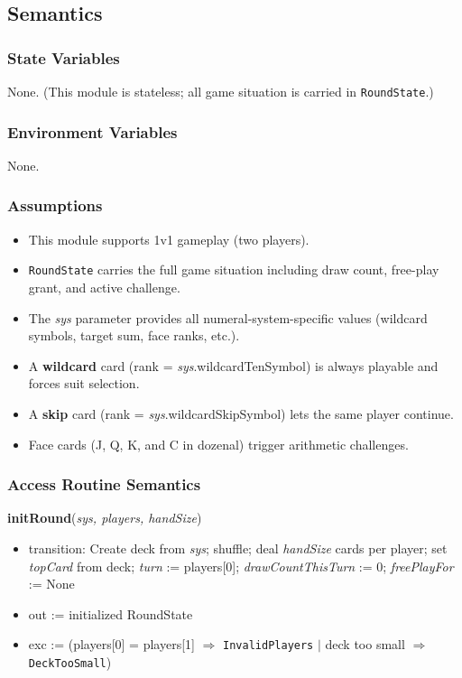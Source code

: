 \documentclass[12pt, titlepage]{article}
\begin{document}
\subsection{Semantics}

\subsubsection{State Variables}
None. (This module is stateless; all game situation is carried in \texttt{RoundState}.)

\subsubsection{Environment Variables}
None.

\subsubsection{Assumptions}
\begin{itemize}
    \item This module supports 1v1 gameplay (two players).
    \item \texttt{RoundState} carries the full game situation including draw count, free-play grant, and active challenge.
    \item The \textit{sys} parameter provides all numeral-system-specific values (wildcard symbols, target sum, face ranks, etc.).
    \item A \textbf{wildcard} card (rank = \textit{sys}.wildcardTenSymbol) is always playable and forces suit selection.
    \item A \textbf{skip} card (rank = \textit{sys}.wildcardSkipSymbol) lets the same player continue.
    \item Face cards (J, Q, K, and C in dozenal) trigger arithmetic challenges.
\end{itemize}

\subsubsection{Access Routine Semantics}

\noindent\textbf{initRound}(\textit{sys, players, handSize})
\begin{itemize}
    \item transition: Create deck from \textit{sys}; shuffle; deal \textit{handSize} cards per player; set \textit{topCard} from deck; \textit{turn} := players[0]; \textit{drawCountThisTurn} := 0; \textit{freePlayFor} := None
    \item out := initialized RoundState
    \item exc := (players[0] = players[1] $\Rightarrow$ \texttt{InvalidPlayers} $|$ deck too small $\Rightarrow$ \texttt{DeckTooSmall})
\end{itemize}
\end{document}
